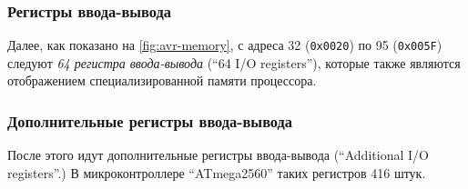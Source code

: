 \documentclass[../sparc.tex]{subfiles}
\begin{document}
\subsubsection{Регистры ввода-вывода}

Далее, как показано на \ref{fig:avr-memory}, с адреса 32
(\texttt{0x0020}) по 95 (\texttt{0x005F}) следуют \emph{64
регистра ввода-вывода} (``64 I/O registers''), которые также являются
отображением специализированной памяти процессора.

\subsubsection{Дополнительные регистры ввода-вывода}

После этого идут дополнительные регистры ввода-вывода (``Additional I/O
registers''.)  В микроконтроллере ``ATmega2560'' таких регистров 416
штук.\cite[22]{avr:atmega2560-datasheet}
\end{document}
